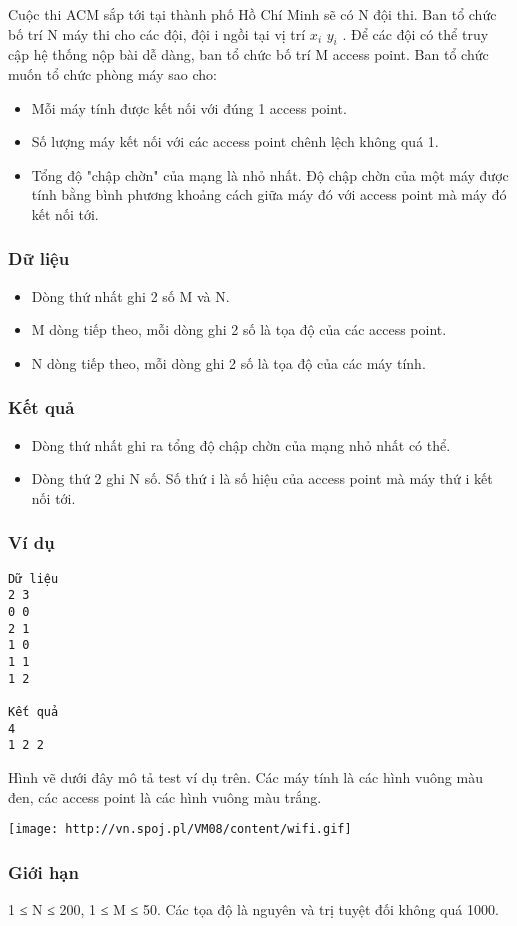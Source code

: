 

Cuộc thi ACM sắp tới tại thành phố Hồ Chí Minh sẽ có N đội thi. Ban tổ chức bố trí N máy thi cho các đội, đội i ngồi tại vị trí $x_{i}$ $y_{i}$ . Để các đội có thể truy cập hệ thống nộp bài dễ dàng, ban tổ chức bố trí M access point. Ban tổ chức muốn tổ chức phòng máy sao cho:
\begin{itemize}
	\item Mỗi máy tính được kết nối với đúng 1 access point.
	\item Số lượng máy kết nối với các access point chênh lệch không quá 1.
	\item Tổng độ "chập chờn" của mạng là nhỏ nhất. Độ chập chờn của một máy được tính bằng bình phương khoảng cách giữa máy đó với access point mà máy đó kết nối tới.
\end{itemize}

\subsubsection{Dữ liệu}
\begin{itemize}
	\item Dòng thứ nhất ghi 2 số M và N.
	\item M dòng tiếp theo, mỗi dòng ghi 2 số là tọa độ của các access point.
	\item N dòng tiếp theo, mỗi dòng ghi 2 số là tọa độ của các máy tính.
\end{itemize}

\subsubsection{Kết quả}
\begin{itemize}
	\item Dòng thứ nhất ghi ra tổng độ chập chờn của mạng nhỏ nhất có thể.
	\item Dòng thứ 2 ghi N số. Số thứ i là số hiệu của access point mà máy thứ i kết nối tới.
\end{itemize}

\subsubsection{Ví dụ}
\begin{verbatim}
Dữ liệu
2 3
0 0
2 1
1 0
1 1
1 2

Kết quả
4
1 2 2
\end{verbatim}

Hình vẽ dưới đây mô tả test ví dụ trên. Các máy tính là các hình vuông màu đen, các access point là các hình vuông màu trắng.


\texttt{[image: http://vn.spoj.pl/VM08/content/wifi.gif]}

\subsubsection{Giới hạn}

1 ≤ N ≤ 200, 1 ≤ M ≤ 50. Các tọa độ là nguyên và trị tuyệt đối không quá 1000.
